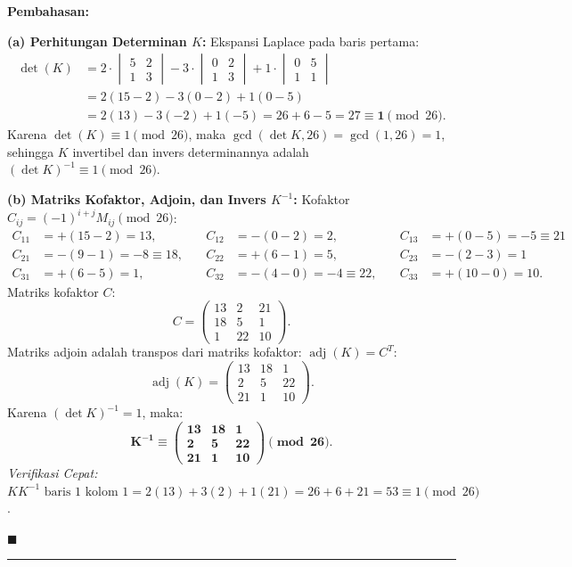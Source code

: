 \documentclass[11pt,a4paper]{article}
\newenvironment{solusi}{\noindent\textbf{\textsf{Pembahasan:}}\par\vspace{0.2em}}{\hfill$\blacksquare$\vspace{1em}\par\hrule\vspace{1em}}
\begin{document}
\begin{solusi}
\textbf{(a) Perhitungan Determinan $K$:}
Ekspansi Laplace pada baris pertama:
\begin{align*}
\det(K) &= 2 \cdot \begin{vmatrix} 5 & 2 \\ 1 & 3 \end{vmatrix} - 3 \cdot \begin{vmatrix} 0 & 2 \\ 1 & 3 \end{vmatrix} + 1 \cdot \begin{vmatrix} 0 & 5 \\ 1 & 1 \end{vmatrix} \\
&= 2(15 - 2) - 3(0 - 2) + 1(0 - 5) \\
&= 2(13) - 3(-2) + 1(-5) = 26 + 6 - 5 = 27 \equiv \mathbf{1} \pmod{26}.
\end{align*}
Karena $\det(K) \equiv 1 \pmod{26}$, maka $\gcd(\det K, 26) = \gcd(1, 26) = 1$, sehingga $K$ invertibel dan invers determinannya adalah $(\det K)^{-1} \equiv 1 \pmod{26}$.

\vspace{0.2cm}
\textbf{(b) Matriks Kofaktor, Adjoin, dan Invers $K^{-1}$:}
Kofaktor $C_{ij} = (-1)^{i+j} M_{ij} \pmod{26}$:
\begin{align*}
C_{11} &= +(15 - 2) = 13, \quad & C_{12} &= -(0 - 2) = 2, \quad & C_{13} &= +(0 - 5) = -5 \equiv 21 \\
C_{21} &= -(9 - 1) = -8 \equiv 18, \quad & C_{22} &= +(6 - 1) = 5, \quad & C_{23} &= -(2 - 3) = 1 \\
C_{31} &= +(6 - 5) = 1, \quad & C_{32} &= -(4 - 0) = -4 \equiv 22, \quad & C_{33} &= +(10 - 0) = 10.
\end{align*}
Matriks kofaktor $C$:
\[
C = \begin{pmatrix} 13 & 2 & 21 \\ 18 & 5 & 1 \\ 1 & 22 & 10 \end{pmatrix}.
\]
Matriks adjoin adalah transpos dari matriks kofaktor: $\operatorname{adj}(K) = C^T$:
\[
\operatorname{adj}(K) = \begin{pmatrix} 13 & 18 & 1 \\ 2 & 5 & 22 \\ 21 & 1 & 10 \end{pmatrix}.
\]
Karena $(\det K)^{-1} = 1$, maka:
\[
\mathbf{K^{-1} \equiv \begin{pmatrix} 13 & 18 & 1 \\ 2 & 5 & 22 \\ 21 & 1 & 10 \end{pmatrix} \pmod{26}}.
\]
\textit{Verifikasi Cepat:} $K K^{-1} \text{ baris 1 kolom 1} = 2(13) + 3(2) + 1(21) = 26 + 6 + 21 = 53 \equiv 1 \pmod{26}$.


\end{solusi}
\end{document}
